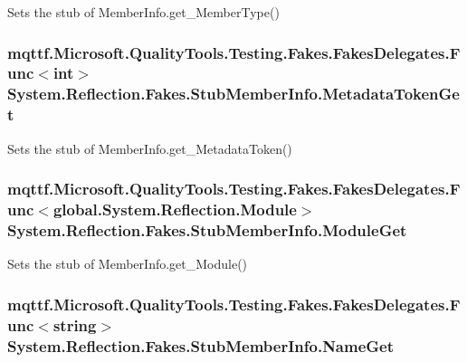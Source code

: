 Sets the stub of Member\-Info.\-get\-\_\-\-Member\-Type()

\hypertarget{class_system_1_1_reflection_1_1_fakes_1_1_stub_member_info_a03563ccf04c3c91ca6bd2c65e13297ec}{
\subsubsection[{Metadata\-Token\-Get}]{\setlength{\rightskip}{0pt plus 5cm}mqttf.\-Microsoft.\-Quality\-Tools.\-Testing.\-Fakes.\-Fakes\-Delegates.\-Func$<$int$>$ System.\-Reflection.\-Fakes.\-Stub\-Member\-Info.\-Metadata\-Token\-Get}}\label{class_system_1_1_reflection_1_1_fakes_1_1_stub_member_info_a03563ccf04c3c91ca6bd2c65e13297ec}


Sets the stub of Member\-Info.\-get\-\_\-\-Metadata\-Token()

\hypertarget{class_system_1_1_reflection_1_1_fakes_1_1_stub_member_info_a16881ac8af3fd0d13ea472a46bdd959c}{
\subsubsection[{Module\-Get}]{\setlength{\rightskip}{0pt plus 5cm}mqttf.\-Microsoft.\-Quality\-Tools.\-Testing.\-Fakes.\-Fakes\-Delegates.\-Func$<$global.\-System.\-Reflection.\-Module$>$ System.\-Reflection.\-Fakes.\-Stub\-Member\-Info.\-Module\-Get}}\label{class_system_1_1_reflection_1_1_fakes_1_1_stub_member_info_a16881ac8af3fd0d13ea472a46bdd959c}


Sets the stub of Member\-Info.\-get\-\_\-\-Module()

\hypertarget{class_system_1_1_reflection_1_1_fakes_1_1_stub_member_info_aaeb1b3f1585f9e2f705465860ebbaca3}{
\subsubsection[{Name\-Get}]{\setlength{\rightskip}{0pt plus 5cm}mqttf.\-Microsoft.\-Quality\-Tools.\-Testing.\-Fakes.\-Fakes\-Delegates.\-Func$<$string$>$ System.\-Reflection.\-Fakes.\-Stub\-Member\-Info.\-Name\-Get}}\label{class_system_1_1_reflection_1_1_fakes_1_1_stub_member_info_aaeb1b3f1585f9e2f705465860ebbaca3}


